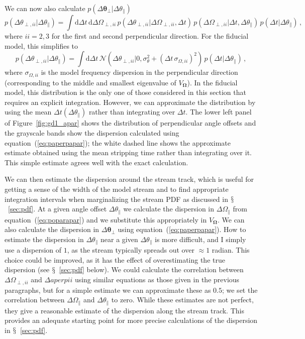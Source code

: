 \documentclass[12pt,preprint]{aastex}
\newcommand{\dd}{\mathrm{d}}
\newcommand{\eqnname}{equation}
\newcommand{\equationname}{\eqnname}
\renewcommand{\figurename}{Figure}
\newcommand{\sectionname}{$\mathsection$}
\renewcommand{\vec}[1]{\ensuremath{\mathbf{#1}}}
\newcommand{\veco}{\ensuremath{\vec{\Omega}}}
\newcommand{\veca}{\ensuremath{\boldsymbol\theta}}
\newcommand{\apar}{\ensuremath{\theta_\parallel}}
\newcommand{\opar}{\ensuremath{\Omega_\parallel}}
\newcommand{\aperp}{\ensuremath{\veca_\perp}}
\newcommand{\aperpii}{\ensuremath{\theta_{\perp,ii}}}
\newcommand{\operpii}{\ensuremath{\Omega_{\perp,ii}}}
\begin{document}
We can now also calculate $p(\Delta \aperp|\Delta \apar)$
\begin{equation}
  p(\Delta \aperpii|\Delta \apar) = \int \dd \Delta t \,\dd \Delta
  \operpii \,p(\Delta \aperpii|\Delta \operpii,\Delta t)\,p(\Delta \operpii|\Delta t,\Delta \apar)\,p(\Delta t|\Delta \apar)\,,
\end{equation}
where $ii=2,3$ for the first and second perpendicular direction. For
the fiducial model, this simplifies to
\begin{equation}\label{eq:paperpapar}
  p(\Delta \aperpii|\Delta \apar) = \int \dd \Delta t \,\mathcal{N}\left(\Delta \aperpii|0,\sigma_{\theta}^2+(\Delta t\,\sigma_{\Omega,ii})^2\right)\,p(\Delta t|\Delta \apar)\,,
\end{equation}
where $\sigma_{\Omega,ii}$ is the model frequency dispersion in the
perpendicular direction (corresponding to the middle and smallest
eigenvalue of $V_\veco$). In the fiducial model, this distribution is
the only one of those considered in this section that requires an
explicit integration. However, we can approximate the distribution by
using the mean $\Delta t(\Delta \apar)$ rather than integrating over
$\Delta t$. The lower left panel of \figurename~\ref{fig:gd1_apar}
shows the distribution of perpendicular angle offsets and the
grayscale bands show the dispersion calculated using
\equationname~(\ref{eq:paperpapar}); the white dashed line shows the
approximate estimate obtained using the mean stripping time rather
than integrating over it. This simple estimate agrees well with the
exact calculation.

We can then estimate the dispersion around the stream track, which is
useful for getting a sense of the width of the model stream and to
find appropriate integration intervals when marginalizing the stream
PDF as discussed in \sectionname~\ref{sec:pdf}. At a given angle
offset $\Delta \apar$ we calculate the dispersion in $\Delta \opar$
from \equationname~(\ref{eq:poparapar}) and we substitute this
appropriately in $V_\veco$. We can also calculate the dispersion in
$\Delta \aperp$ using \equationname~(\ref{eq:paperpapar}). How to
estimate the dispersion in $\Delta \apar$ near a given $\Delta \apar$
is more difficult, and I simply use a dispersion of $1$, as the stream
typically spreads out over $\approx 1$ radian. This choice could be
improved, as it has the effect of overestimating the true dispersion
(see \sectionname~\ref{sec:pdf} below). We could calculate the
correlation between $\Delta \operpii$ and $\Delta aperpii$ using
similar equations as those given in the previous paragraphs, but for a
simple estimate we can approximate these as $0.5$; we set the
correlation between $\Delta \opar$ and $\Delta \apar$ to zero. While
these estimates are not perfect, they give a reasonable estimate of
the dispersion along the stream track. This provides an adequate
starting point for more precise calculations of the dispersion in
\sectionname~\ref{sec:pdf}.
\end{document}
